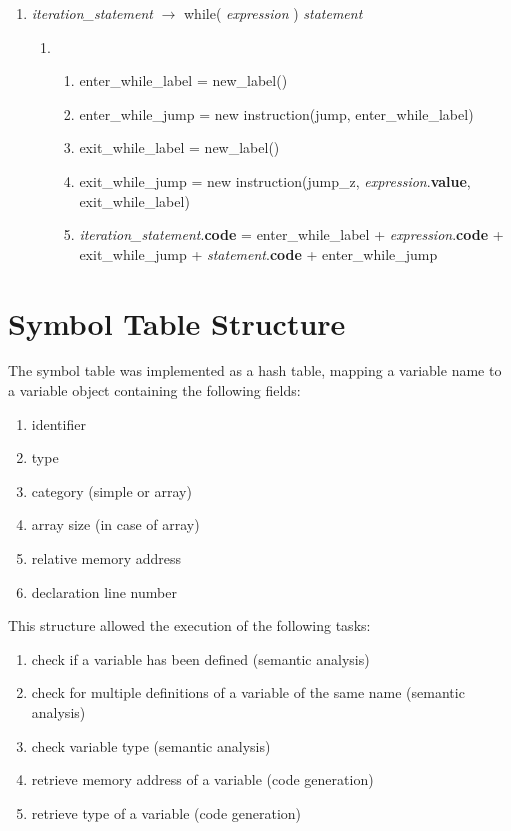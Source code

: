 \documentclass[12pt]{article}
\begin{document}
\begin{enumerate}[label = \arabic*.]
\item \textit{ iteration\_statement } $\rightarrow$ while(\textit{ expression} ) \textit{ statement} 
\begin{enumerate}[label = \roman*.]
\item \begin{enumerate}[label = \alph*.]
\item enter\_while\_label = new\_label()
\item enter\_while\_jump = new instruction(jump, enter\_while\_label)
\item exit\_while\_label = new\_label()
\item exit\_while\_jump = new instruction(jump\_z, \textit{expression}.\textbf{value}, exit\_while\_label)
\item \textit{iteration\_statement}.\textbf{code} = enter\_while\_label + \textit{expression}.\textbf{code} + exit\_while\_jump + \textit{statement}.\textbf{code} + enter\_while\_jump
\end{enumerate}
\end{enumerate}
\end{enumerate}















\section{Symbol Table Structure}
The symbol table was implemented as a hash table, mapping a variable name to a variable object containing the following fields:
\begin{enumerate}
\item identifier
\item type
\item category (simple or array)
\item array size (in case of array)
\item relative memory address
\item declaration line number
\end{enumerate}
This structure allowed the execution of the following tasks:
\begin{enumerate}
\item check if a variable has been defined (semantic analysis)
\item check for multiple definitions of a variable of the same name (semantic analysis)
\item check variable type (semantic analysis)
\item retrieve memory address of a variable (code generation)
\item retrieve type of a variable (code generation)
\end{enumerate}
\end{document}

